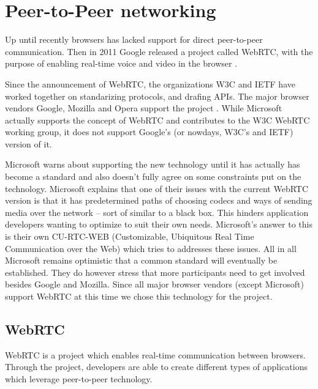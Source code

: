 \section{Peer-to-Peer networking}


Up until recently browsers has lacked support for direct peer-to-peer communication. Then in 2011 Google released a project called WebRTC, with the purpose of enabling real-time voice and video in the browser \cite{WebRTCMemo:Online}.

Since the announcement of WebRTC, the organizations W3C and IETF have worked together on standarizing protocols, and drafing APIs. The major browser vendors Google, Mozilla and Opera support the project \cite{WebRTCAndMicrosoft:2012:Online}. While Microsoft actually supports the concept of WebRTC and contributes to the W3C WebRTC working group, it does not support Google’s (or nowdays, W3C’s and IETF) version of it\cite{WebRTCAndMicrosoft:2012:Online}.
 
Microsoft warns about supporting the new technology until it has actually has become a standard and also doesn’t fully agree on some constraints put on the technology\cite{WebRTCAndMicrosoft:2012:Online}. Microsoft explains that one of their issues with the current WebRTC version is that it has predetermined paths of choosing codecs and ways of sending media over the network – sort of similar to a black box. This hinders application developers wanting to optimize to suit their own needs. Microsoft’s answer to this is their own CU-RTC-WEB (Customizable, Ubiquitous Real Time Communication over the Web) which tries to addresses these issues.
All in all Microsoft remains optimistic that a common standard will eventually be established\cite{WebRTCAndMicrosoft:2012:Online}. They do however stress that more participants need to get involved besides Google and Mozilla. Since all major browser vendors (except Microsoft) support WebRTC at this time we chose this technology for the project.

\subsection{WebRTC}
WebRTC is a project which enables real-time communication between browsers\cite{WebRTC:Online}. Through the project, developers are able to create different types of applications which leverage peer-to-peer technology.

